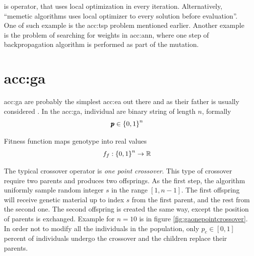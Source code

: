  is operator, that uses local optimization in every iteration. Alternatively, \enquote{memetic algorithms uses local optimizer to every solution before evaluation}\citep{HowToSolveItModernHeuristics}. One of such example is the \acrlong{acc:tsp} problem mentioned earlier. Another example is the problem of searching for weights in \acrshort{acc:ann}, where one step of backpropagation algorithm is performed as part of the mutation.




\section{\texorpdfstring{\acrlong*{acc:ga}}{}}

\acrfull{acc:ga} are probably the simplest \acrfull{acc:ea} out there and as their father is usually considered . In the \acrshort{acc:ga}, individual are binary string of length $n$, formally
$$ \pmb{p} \in \left\{0,1\right\}^{n} $$

Fitness function maps genotype into real values
$$ f_f:\left\{0,1\right\}^{n}\rightarrow\mathbb{R} $$

The typical crossover operator is \emph{one point crossover}. This type of crossover require two parents and produces two offsprings. As the first step, the algorithm uniformly sample random integer $s$ in the range $\left[ 1, n-1 \right]$. The first offspring will receive genetic material up to index $s$ from the first parent, and the rest from the second one. The second offspring is created the same way, except the position of parents is exchanged. Example for $n=10$ is in figure \ref{fig:gaonepointcrossover}. In order not to modify all the individuals in the population, only $p_c\in\left[0,1\right]$ percent of individuals undergo the crossover and the children replace their parents\citep{IntroductionToEA}.

